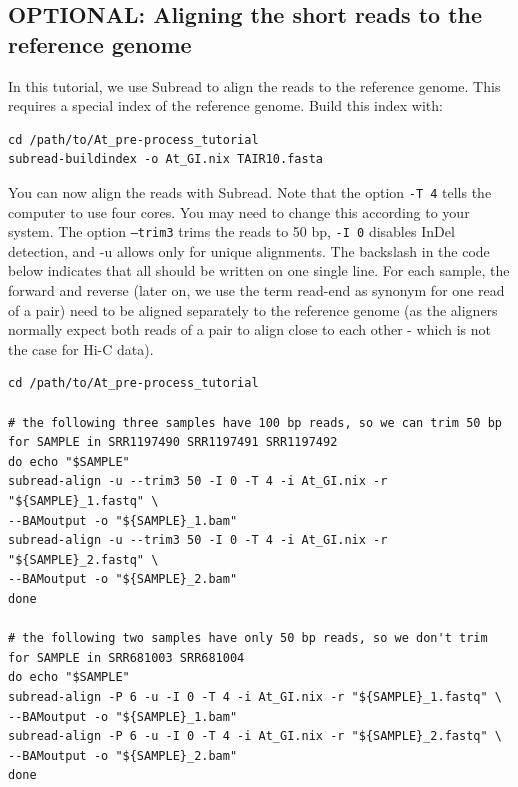 \documentclass[a4paper,10pt]{article}
\begin{document}
\subsection{OPTIONAL: Aligning the short reads to the reference genome}
In this tutorial, we use Subread \cite{2013_Liao} to align the reads to the reference genome. This requires a special index of the reference genome. Build this index with:
\begin{verbatim}
cd /path/to/At_pre-process_tutorial
subread-buildindex -o At_GI.nix TAIR10.fasta 
\end{verbatim}
You can now align the reads with Subread. Note that the option \texttt{-T 4} tells the computer to use four cores. You may need to change this according to your system. The option \texttt{--trim3} trims the reads to 50 bp, \texttt{-I 0} disables InDel detection, and -u allows only for unique alignments. The backslash in the code below indicates that all should be written on one single line. For each sample, the forward and reverse (later on, we use the term read-end as synonym for one read of a pair) need to be aligned separately to the reference genome (as the aligners normally expect both reads of a pair to align close to each other - which is not the case for Hi-C data). 
\begin{verbatim}
cd /path/to/At_pre-process_tutorial

# the following three samples have 100 bp reads, so we can trim 50 bp
for SAMPLE in SRR1197490 SRR1197491 SRR1197492
do echo "$SAMPLE"
subread-align -u --trim3 50 -I 0 -T 4 -i At_GI.nix -r "${SAMPLE}_1.fastq" \
--BAMoutput -o "${SAMPLE}_1.bam"
subread-align -u --trim3 50 -I 0 -T 4 -i At_GI.nix -r "${SAMPLE}_2.fastq" \
--BAMoutput -o "${SAMPLE}_2.bam"
done

# the following two samples have only 50 bp reads, so we don't trim
for SAMPLE in SRR681003 SRR681004
do echo "$SAMPLE"
subread-align -P 6 -u -I 0 -T 4 -i At_GI.nix -r "${SAMPLE}_1.fastq" \
--BAMoutput -o "${SAMPLE}_1.bam"
subread-align -P 6 -u -I 0 -T 4 -i At_GI.nix -r "${SAMPLE}_2.fastq" \
--BAMoutput -o "${SAMPLE}_2.bam"
done
\end{verbatim}
\end{document}
